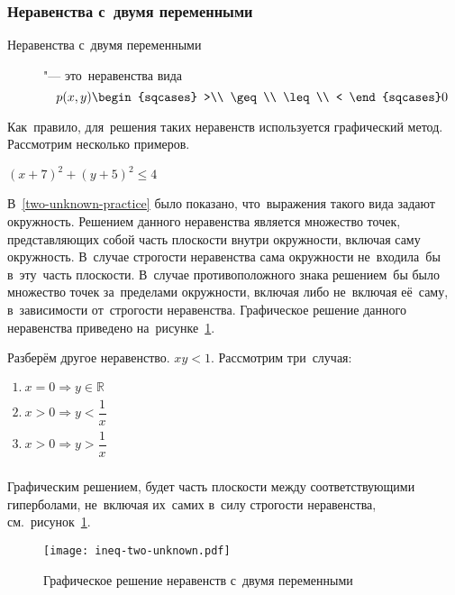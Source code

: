 \documentclass[]{scrartcl}
\begin{document}
\subsubsection{Неравенства с~двумя переменными}
\begin{description}
	\item[Неравенства с~двумя переменными] "--- это~неравенства вида
	\begin{equation}\label{eq:inequal-two-unknown-1}
	p(x,y)
	\begin{sqcases}
	>\\
	\geq\\
	\leq\\
	<
	\end{sqcases}
	0
	\end{equation}
\end{description}
Как~правило, для~решения таких неравенств используется графический метод. Рассмотрим несколько примеров.
\begin{Thexmpl}
	${\textstyle (x+7)^{2}+(y+5)^{2}\leq 4}$
	
	В~\ref{two-unknown-practice} было показано, что~выражения такого вида задают окружность. Решением данного неравенства является множество точек, представляющих собой часть плоскости внутри окружности, включая саму окружность. В~случае строгости неравенства сама окружности не~входила~бы в~эту~часть плоскости. В~случае противоположного знака решением~бы было множество точек за~пределами окружности, включая либо не~включая её~саму, в~зависимости от~строгости неравенства. Графическое решение данного неравенства приведено на~рисунке~\ref{fig:ineq-two-unknown}.
\end{Thexmpl}

\begin{Thexmpl}
	Разберём другое неравенство. ${\textstyle xy<1}$. Рассмотрим три~случая:
	
	${\displaystyle 
	\begin{aligned}
	1.\ x=0 \Rightarrow y \in \mathbb{R}\\
	2.\ x>0 \Rightarrow y<\dfrac{1}{x}\\
	3.\ x>0 \Rightarrow y>\dfrac{1}{x}\\ 
	\end{aligned}}
	$
	
	Графическим решением, будет часть плоскости между соответствующими гиперболами, не~включая их~самих в~силу строгости неравенства, см.~рисунок~\ref{fig:ineq-two-unknown}. 
\end{Thexmpl}

\begin{figure}[ht]
	\centering %
	\texttt{[image: ineq-two-unknown.pdf]}
	\caption{Графическое решение неравенств с~двумя переменными}\label{fig:ineq-two-unknown}
\end{figure} 
\end{document}
